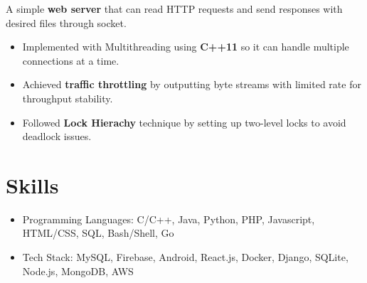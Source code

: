 \documentclass{resume}
\begin{document}
  A simple \textbf{web server} that can read HTTP requests and send responses with desired files through socket.
\begin{itemize}
  \item Implemented with Multithreading using \textbf{C++11} so it can handle multiple connections at a time.
  \item Achieved \textbf{traffic throttling} by outputting byte streams with limited rate for throughput stability.
  \item Followed \textbf{Lock Hierachy} technique by setting up two-level locks to avoid deadlock issues.
\end{itemize}

\section{Skills}
\begin{itemize}[parsep=0.5ex]
  \item Programming Languages: C/C++, Java, Python, PHP, Javascript, HTML/CSS, SQL, Bash/Shell, Go
  \item Tech Stack: MySQL, Firebase, Android, React.js, Docker, Django, SQLite, Node.js, MongoDB, AWS
\end{itemize}
\end{document}
